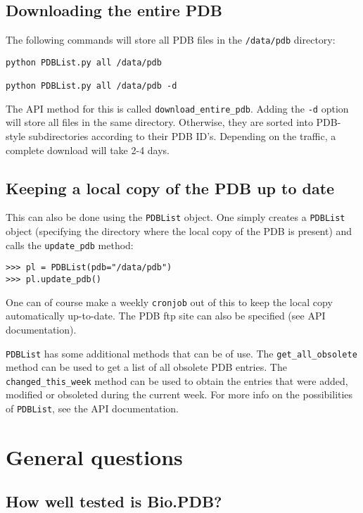 \subsection{Downloading the entire PDB}

The following commands will store all PDB files in the \texttt{/data/pdb}
directory:

\begin{verbatim}
python PDBList.py all /data/pdb

python PDBList.py all /data/pdb -d
\end{verbatim}
\noindent The API method for this is called \texttt{download\_entire\_pdb}.
Adding the \texttt{-d} option will store all files in the same directory.
Otherwise, they are sorted into PDB-style subdirectories according
to their PDB ID's. Depending on the traffic, a complete download will
take 2-4 days.

\subsection{Keeping a local copy of the PDB up to date}

This can also be done using the \texttt{PDBList} object. One simply
creates a \texttt{PDBList} object (specifying the directory where
the local copy of the PDB is present) and calls the \texttt{update\_pdb}
method:

\begin{verbatim}
>>> pl = PDBList(pdb="/data/pdb")
>>> pl.update_pdb()
\end{verbatim}
One can of course make a weekly \texttt{cronjob} out of this to keep
the local copy automatically up-to-date. The PDB ftp site can also
be specified (see API documentation).

\texttt{PDBList} has some additional methods that can be of use. The
\texttt{get\_all\_obsolete} method can be used to get a list of all
obsolete PDB entries. The \texttt{changed\_this\_week} method can
be used to obtain the entries that were added, modified or obsoleted
during the current week. For more info on the possibilities of \texttt{PDBList},
see the API documentation.

\section{General questions}

\subsection{How well tested is Bio.PDB?}


